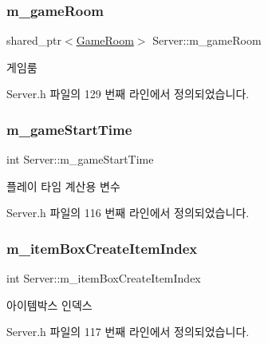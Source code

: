 \subsubsection{\texorpdfstring{m\+\_\+game\+Room}{m\_gameRoom}}
{\footnotesize\ttfamily shared\+\_\+ptr$<$\hyperlink{class_game_room}{Game\+Room}$>$ Server\+::m\+\_\+game\+Room\hspace{0.3cm}{\ttfamily [private]}}



게임룸 



Server.\+h 파일의 129 번째 라인에서 정의되었습니다.

\mbox{\label{class_server_a8506d244bc66607aaae1e0374f57bf99}} 
\subsubsection{\texorpdfstring{m\+\_\+game\+Start\+Time}{m\_gameStartTime}}
{\footnotesize\ttfamily int Server\+::m\+\_\+game\+Start\+Time\hspace{0.3cm}{\ttfamily [private]}}



플레이 타임 계산용 변수 



Server.\+h 파일의 116 번째 라인에서 정의되었습니다.

\mbox{\label{class_server_a172443f3be6f379fea950b0418799812}} 
\subsubsection{\texorpdfstring{m\+\_\+item\+Box\+Create\+Item\+Index}{m\_itemBoxCreateItemIndex}}
{\footnotesize\ttfamily int Server\+::m\+\_\+item\+Box\+Create\+Item\+Index\hspace{0.3cm}{\ttfamily [private]}}



아이템박스 인덱스 



Server.\+h 파일의 117 번째 라인에서 정의되었습니다.

